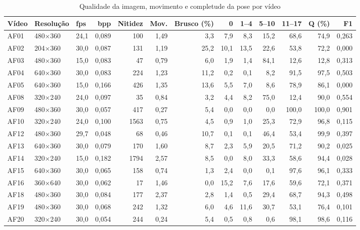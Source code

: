 \begin{table}[htbp]
\centering
\scriptsize\setlength{\tabcolsep}{3pt}
\caption{Qualidade da imagem, movimento e completude da pose por vídeo}
\label{tab:qualidade-videos}
\begin{tabular}{lllrrrrrrrrrr}
\toprule
Vídeo & Resolução & fps & bpp & Nitidez & Mov. & Brusco (\%) & 0 & 1--4 & 5--10 & 11--17 & Q (\%) & F1 \\
\midrule
AF01 & 480$\times$360 & 24,1 & 0,089 & 100 & 1,49 & 3,3 & 7,9 & 8,3 & 15,2 & 68,6 & 74,9 & 0,263 \\
AF02 & 204$\times$360 & 30,0 & 0,087 & 131 & 1,19 & 25,2 & 10,1 & 13,5 & 22,6 & 53,8 & 72,2 & 0,000 \\
AF03 & 480$\times$360 & 15,0 & 0,083 & 47 & 0,79 & 6,0 & 1,9 & 1,4 & 84,1 & 12,6 & 12,8 & 0,313 \\
AF04 & 640$\times$360 & 30,0 & 0,083 & 224 & 1,23 & 11,2 & 0,2 & 0,1 & 8,2 & 91,5 & 97,5 & 0,503 \\
AF05 & 640$\times$360 & 15,0 & 0,166 & 426 & 1,35 & 13,6 & 5,5 & 7,0 & 8,6 & 78,9 & 86,1 & 0,000 \\
AF08 & 320$\times$240 & 24,0 & 0,097 & 35 & 0,84 & 3,2 & 4,4 & 8,2 & 75,0 & 12,4 & 90,0 & 0,554 \\
AF09 & 480$\times$360 & 30,0 & 0,057 & 417 & 0,27 & 5,4 & 0,0 & 0,0 & 0,0 & 100,0 & 100,0 & 0,901 \\
AF10 & 320$\times$240 & 24,0 & 0,100 & 1563 & 0,75 & 4,5 & 0,9 & 1,0 & 25,3 & 72,9 & 96,8 & 0,115 \\
AF12 & 480$\times$360 & 29,7 & 0,048 & 68 & 0,46 & 10,7 & 0,1 & 0,1 & 46,4 & 53,4 & 99,9 & 0,397 \\
AF13 & 640$\times$360 & 30,0 & 0,079 & 170 & 1,60 & 8,7 & 2,3 & 5,9 & 20,5 & 71,2 & 90,2 & 0,025 \\
AF14 & 320$\times$240 & 15,0 & 0,182 & 1794 & 2,57 & 8,5 & 0,0 & 8,0 & 33,3 & 58,6 & 94,4 & 0,028 \\
AF15 & 640$\times$360 & 30,0 & 0,065 & 158 & 0,74 & 1,3 & 2,4 & 0,0 & 0,1 & 97,6 & 96,1 & 0,333 \\
AF16 & 360$\times$640 & 30,0 & 0,062 & 17 & 1,46 & 0,0 & 15,2 & 7,6 & 17,6 & 59,6 & 72,1 & 0,371 \\
AF18 & 480$\times$360 & 30,0 & 0,084 & 177 & 2,37 & 2,8 & 1,4 & 0,5 & 29,4 & 68,7 & 94,3 & 0,498 \\
AF19 & 480$\times$360 & 30,0 & 0,068 & 242 & 1,32 & 6,0 & 4,6 & 11,6 & 30,7 & 53,1 & 76,4 & 0,101 \\
AF20 & 320$\times$240 & 30,0 & 0,054 & 244 & 0,24 & 5,4 & 0,5 & 0,8 & 0,6 & 98,1 & 98,6 & 0,116 \\

\end{tabular}
\end{table}
